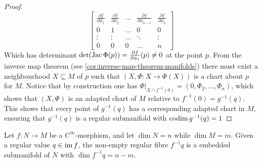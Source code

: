 \begin{proof}
\[\begin{bmatrix}
            \frac{\partial f}{\partial \phi_1}
                   & \frac{\partial f}{\partial \phi_2}
                   & \dots
                   & \frac{\partial f}{\partial \phi_{n-1}}
                   & \frac{\partial f}{\partial \phi_n}
            \\
            0      & 1                                      & \dots & 0      & 0
            \\
            \vdots & \vdots                                 & \dots & \ddots & \vdots
            \\
            0      & 0                                      & 0     & \dots  & n
        \end{bmatrix}
    \]
    Which has determinant
    \(\det(\operatorname{Jac} \Phi(p)) = \frac{\partial f}{\partial \phi_1}(p) \neq 0\) at the
    point \(p\). From the inverse map theorem (see
    \cref{cor:inverse-map-theorem-manifolds}) there must exist a neighbourhood
    \(X \subseteq M\) of \(p\) such that \((X, \Phi: X \to \Phi(X))\) is a chart
    about \(p\) for \(M\). Notice that by construction one has
    \(\Phi|_{X \cap f^{-1}(0)} = (0, \Phi_2, \dots, \Phi_n)\), which shows that
    \((X, \Phi)\) is an adapted chart of \(M\) relative to
    \(f^{-1}(0) = g^{-1}(q)\). This shows that every point of \(g^{-1}(q)\) has a
    corresponding adapted chart in \(M\), ensuring that \(g^{-1}(q)\) is a regular
    submanifold with \(\operatorname{codim} g^{-1}(q) = 1\)
\end{proof}

\begin{theorem}
    \label{thm:regular-fibre-theorem}
    Let \(f: N \to M\) be a \(C^{\infty}\)-morphism, and let \(\dim N = n\) while
    \(\dim M = m\). Given a regular value \(q \in \operatorname{im} f\), the non-empty regular
    fibre \(f^{-1} q\) is a embedded submanifold of \(N\) with
    \(\dim f^{-1} q = n - m\).
\end{theorem}

